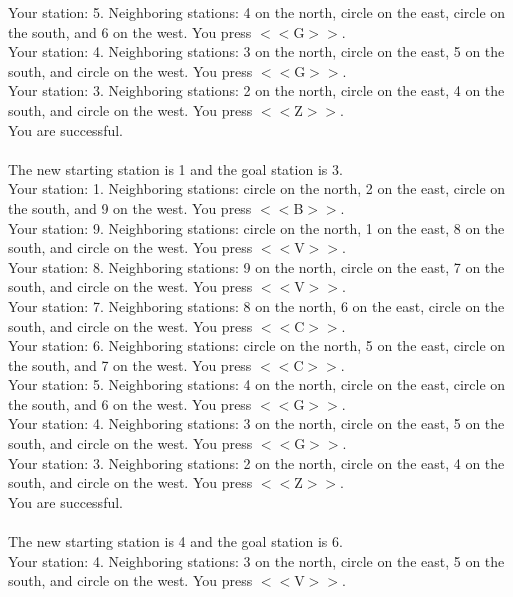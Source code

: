 \documentclass[pdflatex,sn-nature]{sn-jnl}%
\theoremstyle{thmstyleone}%
\theoremstyle{thmstyletwo}%
\theoremstyle{thmstylethree}%
\begin{document}
Your station: 5. Neighboring stations: 4 on the north, circle on the east, circle on the south, and 6 on the west. You press $<<$G$>>$. $~$\\ 
Your station: 4. Neighboring stations: 3 on the north, circle on the east, 5 on the south, and circle on the west. You press $<<$G$>>$. $~$\\ 
Your station: 3. Neighboring stations: 2 on the north, circle on the east, 4 on the south, and circle on the west. You press $<<$Z$>>$. $~$\\ 
You are successful. $~$\\ 
 $~$\\ 
The new starting station is 1 and the goal station is 3. $~$\\ 
Your station: 1. Neighboring stations: circle on the north, 2 on the east, circle on the south, and 9 on the west. You press $<<$B$>>$. $~$\\ 
Your station: 9. Neighboring stations: circle on the north, 1 on the east, 8 on the south, and circle on the west. You press $<<$V$>>$. $~$\\ 
Your station: 8. Neighboring stations: 9 on the north, circle on the east, 7 on the south, and circle on the west. You press $<<$V$>>$. $~$\\ 
Your station: 7. Neighboring stations: 8 on the north, 6 on the east, circle on the south, and circle on the west. You press $<<$C$>>$. $~$\\ 
Your station: 6. Neighboring stations: circle on the north, 5 on the east, circle on the south, and 7 on the west. You press $<<$C$>>$. $~$\\ 
Your station: 5. Neighboring stations: 4 on the north, circle on the east, circle on the south, and 6 on the west. You press $<<$G$>>$. $~$\\ 
Your station: 4. Neighboring stations: 3 on the north, circle on the east, 5 on the south, and circle on the west. You press $<<$G$>>$. $~$\\ 
Your station: 3. Neighboring stations: 2 on the north, circle on the east, 4 on the south, and circle on the west. You press $<<$Z$>>$. $~$\\ 
You are successful. $~$\\ 
 $~$\\ 
The new starting station is 4 and the goal station is 6. $~$\\ 
Your station: 4. Neighboring stations: 3 on the north, circle on the east, 5 on the south, and circle on the west. You press $<<$V$>>$. $~$\\ 
\end{document}
